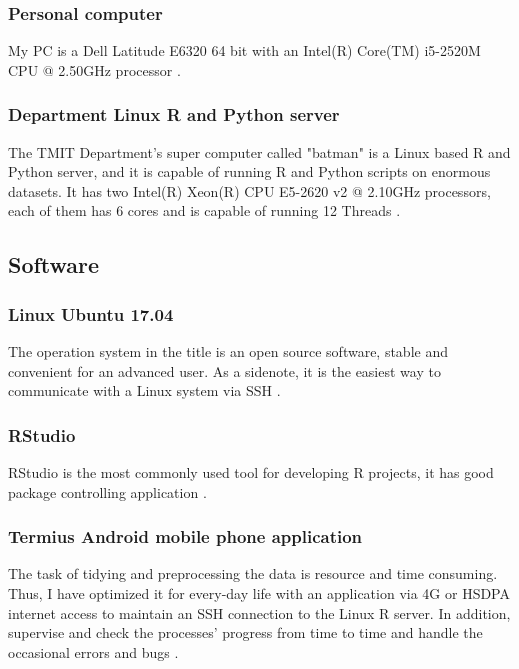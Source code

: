 			\subsubsection{Personal computer}
My PC is a Dell Latitude E6320 64 bit with an Intel(R) Core(TM) i5-2520M CPU @ 2.50GHz processor \cite{Latitude}.
			\subsubsection{Department Linux R and Python server}
The TMIT Department's super computer called "batman" is a Linux based R and Python server, and it is capable of running R and Python scripts on enormous datasets. It has two Intel(R) Xeon(R) CPU E5-2620 v2 @ 2.10GHz processors, each of them has 6 cores and is capable of running 12 Threads \cite{Batman}.
		\subsection{Software}
			\subsubsection{Linux Ubuntu 17.04}
The operation system in the title is an open source software, stable and convenient for an advanced user. As a sidenote, it is the easiest way to communicate with a Linux system \cite{Ubuntu} via SSH \cite{SSH}.
			\subsubsection{RStudio}
RStudio is the most commonly used tool for developing R projects, it has good package controlling application \cite{RStudio}.
			\subsubsection{Termius Android mobile phone application}
The task of tidying \cite{Tidy} and preprocessing the data is resource and time consuming. Thus, I have optimized it for every-day life with an application via 4G or HSDPA internet access to maintain an SSH connection to the Linux R server. In addition, supervise and check the processes' progress from time to time and handle the occasional errors and bugs \cite{Termius}.
